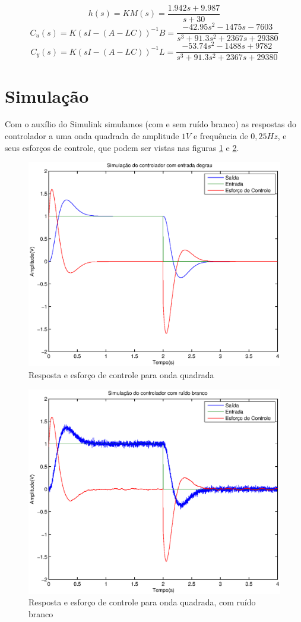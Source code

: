\documentclass{article}
\begin{document}
\begin{equation}
\label{eq:hs}
h(s) = KM(s) = \frac{1.942s+9.987}{s+30}
\end{equation}
\begin{equation}
\label{eq:cus}
C_u(s) = K(sI - (A - LC))^{-1}B = \frac{-42.95s^2-1475s-7603}{s^3+91.3s^2+2367s+29380}
\end{equation}
\begin{equation}
\label{eq:cys}
C_y(s) = K(sI - (A - LC))^{-1}L = \frac{-53.74s^2-1488s+9782}{s^3+91.3s^2+2367s+29380}
\end{equation}


\section{Simulação}
Com o auxílio do Simulink simulamos (com e sem ruído branco) as respostas do controlador a uma onda quadrada de amplitude $1V$ e frequência de $0,25Hz$, e seus esforços de controle, que podem ser vistas nas figuras \ref{fig:yur} e \ref{fig:yurN}.
\begin{figure}[H]
	\centering
	\includegraphics[width=0.8\linewidth]{../yur}
	\caption{Resposta e esforço de controle para onda quadrada}
	\label{fig:yur}
\end{figure}
\begin{figure}[H]
	\centering
	\includegraphics[width=0.8\linewidth]{../yurN}
	\caption{Resposta e esforço de controle para onda quadrada, com ruído branco}
	\label{fig:yurN}
\end{figure}
\end{document}
